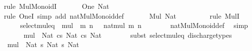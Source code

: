 \begin{isabellebody}
%
\isadelimproof
%
\endisadelimproof
%
\isatagproof
{}\isamarkupfalse%
\ {\isacharparenleft}{\kern0pt}rule\ Mul{\isacharunderscore}{\kern0pt}MonoidI{\isacharparenright}{\kern0pt}\isanewline
\ \ \isamarkupfalse%
\ {\isachardoublequoteopen}{\isacharparenleft}{\kern0pt}{\isasymnat}{\isacharcomma}{\kern0pt}\ {\isacharasterisk}{\kern0pt}{\isacharparenright}{\kern0pt}\ {\isacharcolon}{\kern0pt}\ One\ Nat{\isachardoublequoteclose}\isanewline
\ \ \ \ \isamarkupfalse%
\ {\isacharparenleft}{\kern0pt}rule\ OneI{\isacharparenright}{\kern0pt}\ {\isacharparenleft}{\kern0pt}simp\ add{\isacharcolon}{\kern0pt}\ nat{\isacharunderscore}{\kern0pt}Mul{\isacharunderscore}{\kern0pt}Monoid{\isacharunderscore}{\kern0pt}def{\isacharparenright}{\kern0pt}\isanewline
\ \ \isamarkupfalse%
\ {\isachardoublequoteopen}{\isacharparenleft}{\kern0pt}{\isasymnat}{\isacharcomma}{\kern0pt}\ {\isacharasterisk}{\kern0pt}{\isacharparenright}{\kern0pt}\ {\isacharcolon}{\kern0pt}\ Mul\ Nat{\isachardoublequoteclose}\isanewline
\ \ \isanewline
\ \ \isanewline
\ \ \isamarkupfalse%
\ {\isacharparenleft}{\kern0pt}rule\ MulI{\isacharparenright}{\kern0pt}\isanewline
\ \ \ \ \isamarkupfalse%
\ select{\isacharunderscore}{\kern0pt}mul{\isacharunderscore}{\kern0pt}eq{\isacharcolon}{\kern0pt}\ {\isachardoublequoteopen}{\isacharparenleft}{\kern0pt}{\isasymnat}{\isacharcomma}{\kern0pt}\ {\isacharasterisk}{\kern0pt}{\isacharparenright}{\kern0pt}{\isacharat}{\kern0pt}{\isacharat}{\kern0pt}mul\ {\isacharequal}{\kern0pt}\ {\isasymlambda}m\ n\ {\isasymin}\ {\isasymnat}{\isachardot}{\kern0pt}\ nat{\isacharunderscore}{\kern0pt}mul\ m\ n{\isachardoublequoteclose}\isanewline
\ \ \ \ \ \ \isamarkupfalse%
\ nat{\isacharunderscore}{\kern0pt}Mul{\isacharunderscore}{\kern0pt}Monoid{\isacharunderscore}{\kern0pt}def\ \isamarkupfalse%
\ simp\isanewline
\ \ \ \ \isamarkupfalse%
\ {\isachardoublequoteopen}{\isacharparenleft}{\kern0pt}{\isasymnat}{\isacharcomma}{\kern0pt}\ {\isacharasterisk}{\kern0pt}{\isacharparenright}{\kern0pt}{\isacharat}{\kern0pt}{\isacharat}{\kern0pt}mul\ {\isacharcolon}{\kern0pt}\ Nat\ {\isasymrightarrow}cs\ Nat\ {\isasymrightarrow}cs\ Nat{\isachardoublequoteclose}\isanewline
\ \ \ \ \ \ \isamarkupfalse%
\ {\isacharparenleft}{\kern0pt}subst\ select{\isacharunderscore}{\kern0pt}mul{\isacharunderscore}{\kern0pt}eq{\isacharparenright}{\kern0pt}\ discharge{\isacharunderscore}{\kern0pt}types\isanewline
\ \ \ \ \isamarkupfalse%
\ {\isachardoublequoteopen}{\isacharparenleft}{\kern0pt}{\isasymnat}{\isacharcomma}{\kern0pt}\ {\isacharasterisk}{\kern0pt}{\isacharparenright}{\kern0pt}{\isacharat}{\kern0pt}{\isacharat}{\kern0pt}mul\ {\isacharcolon}{\kern0pt}\ Nat\ {\isasymrightarrow}s\ Nat\ {\isasymrightarrow}s\ Nat{\isachardoublequoteclose}\isanewline

\end{isabellebody}
